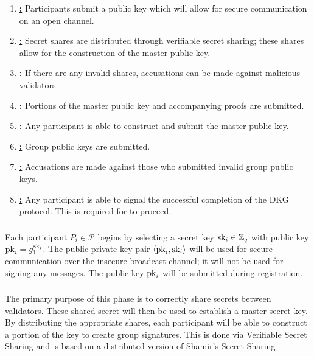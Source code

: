 \begin{enumerate}
\item \hyperref[sssec:registration]{\textbf{\Registration{}:}}
    Participants submit a public key
    which will allow for secure communication on an open channel.
\item \hyperref[sssec:share_distribution]{\textbf{\ShareDistribution{}:}}
    Secret shares are distributed
    through verifiable secret sharing;
    these shares allow for the construction of the master public key.
\item \hyperref[sssec:share_distribution_dispute]{\textbf{\ShareDistributionDispute{}:}}
    If there are any invalid shares,
    accusations can be made against malicious validators.
\item \hyperref[sssec:key_share_submission]{\textbf{\KeyShare{}:}}
    Portions of the master public key and accompanying
    proofs are submitted.
\item \hyperref[sssec:mpk_submission]{\textbf{\MasterPublicKey{}:}}
    Any participant is able to construct and submit
    the master public key.
\item \hyperref[sssec:gpkj_submission]{\textbf{\GPKSubmission{}:}}
    Group public keys are submitted.
\item \hyperref[sssec:gpkj_dispute]{\textbf{\GPKDispute{}:}}
    Accusations are made against those who submitted invalid
    group public keys.
\item \hyperref[sssec:gpkj_complete]{\textbf{\Completion{}:}}
    Any participant is able to signal the successful completion
    of the DKG protocol.
    This is required for \LayerTwo{} to proceed.
\end{enumerate}



\subsubsection{\Registration{}}
\label{sssec:registration}
Each participant $P_{i}\in\mathcal{P}$ begins by selecting
a secret key $\textrm{sk}_{i}\in\mathbb{Z}_{q}$ with public key $\textrm{pk}_{i} = g_{1}^{\textrm{sk}_{i}}$.
The public-private key pair $\left\langle \textrm{pk}_{i},\textrm{sk}_{i} \right\rangle$ will be
used for secure communication over the insecure broadcast channel;
it will not be used for signing any messages.
The public key $\textrm{pk}_{i}$ will be submitted during registration.



\subsubsection{\ShareDistribution{}}
\label{sssec:share_distribution}
The primary purpose of this phase is to correctly share secrets
between validators.
These shared secret will then be used to establish a master secret key.
By distributing the appropriate shares,
each participant will be able to construct a portion
of the key to create group signatures.
This is done via Verifiable Secret Sharing
and is based on a distributed version of
Shamir's Secret Sharing~\cite{shamir1979share}.

